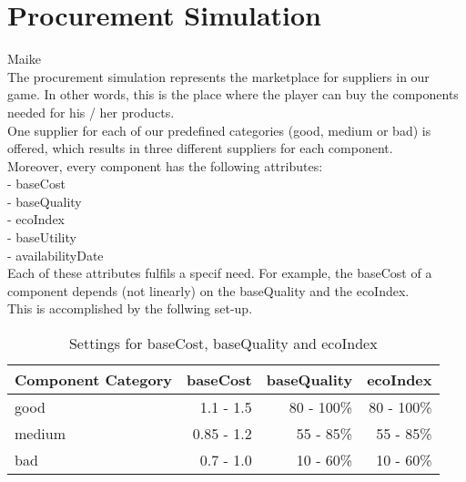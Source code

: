\section{Procurement Simulation}
Maike\\
The procurement simulation represents the marketplace for suppliers in our game. In other words, this is the place where the player can buy the components needed for his / her products.\\
One supplier for each of our predefined categories (good, medium or bad) is offered, which results in three different suppliers for each component. \\
Moreover, every component has the following attributes: \\
- baseCost\\
- baseQuality\\
- ecoIndex\\
- baseUtility\\
- availabilityDate\\

Each of these attributes fulfils a specif need. 
For example, the baseCost of a component depends (not linearly) on the baseQuality and the ecoIndex.\\
This is accomplished by the follwing set-up.

    \begin{table}[ht]
    \centering
    \begin{tabular}{|l|r|r|r|}
    \hline
    Component Category & baseCost & baseQuality & ecoIndex \\
    \hline
    good & 1.1 - 1.5 & 80 - 100\% & 80 - 100\% \\
    medium & 0.85 - 1.2 & 55 - 85\% & 55 - 85\%\\
    bad  & 0.7 - 1.0 & 10 - 60\% & 10 - 60\%\\
    \hline
    \end{tabular}
    \caption{Settings for baseCost, baseQuality and ecoIndex}
    \label{component_price_calculation}
    \end{table}

